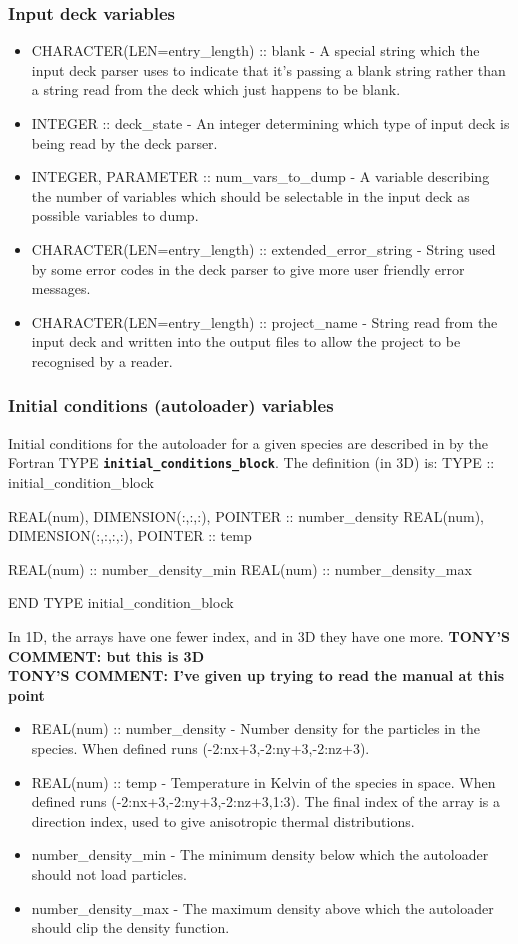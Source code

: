 \documentclass[12pt,a4paper]{article}
\newcommand{\inlinecode}[1]{{\color{warwickred} \bf\texttt{#1}}}
\newcommand{\EPOCH}{{\color{warwickdark}\fontfamily{phv}\selectfont{EPOCH}}}
\newcommand{\tony}[1]{{\color{warwickred} \bf{TONY'S COMMENT:} \bf{#1}}\\}
\newenvironment{boxverbatim}{\lboxverbatim{none}}{\endlboxverbatim}
\begin{document}
\subsubsection{Input deck variables}
\begin{itemize}
\item CHARACTER(LEN=entry\_length) :: blank - A special string which the input
  deck parser uses to indicate that it's passing a blank string rather than a
  string read from the deck which just happens to be blank.
\item INTEGER :: deck\_state - An integer determining which type of input deck
  is being read by the deck parser.
\item INTEGER, PARAMETER :: num\_vars\_to\_dump - A variable describing the
  number of variables which should be selectable in the input deck as possible
  variables to dump.
\item CHARACTER(LEN=entry\_length) :: extended\_error\_string - String used by
  some error codes in the deck parser to give more user friendly error
  messages.
\item CHARACTER(LEN=entry\_length) :: project\_name - String read from the
  input deck and written into the output files to allow the project to be
  recognised by a reader.
\end{itemize}

\subsubsection{Initial conditions (autoloader) variables}
Initial conditions for the autoloader for a given species are described in
{\EPOCH} by the Fortran TYPE \inlinecode{initial\_conditions\_block}. The
definition (in 3D) is:
\begin{boxverbatim}
TYPE :: initial_condition_block

  REAL(num), DIMENSION(:,:,:), POINTER :: number_density
  REAL(num), DIMENSION(:,:,:,:), POINTER :: temp

  REAL(num) :: number_density_min
  REAL(num) :: number_density_max

END TYPE initial_condition_block
\end{boxverbatim}

In 1D, the arrays have one fewer index, and in 3D they have one more.
\tony{but this is 3D}
\tony{I've given up trying to read the manual at this point}

\begin{itemize}
\item REAL(num) :: number\_density - Number density for the particles in the species. When
  defined runs (-2:nx+3,-2:ny+3,-2:nz+3).
\item REAL(num) :: temp - Temperature in Kelvin of the species in space. When
  defined runs (-2:nx+3,-2:ny+3,-2:nz+3,1:3). The final index of the array
  is a direction index, used to give anisotropic thermal distributions.
\item number\_density\_min - The minimum density below which the autoloader should not load
  particles.
\item number\_density\_max - The maximum density above which the autoloader should clip the
  density function.
\end{itemize}
\end{document}
